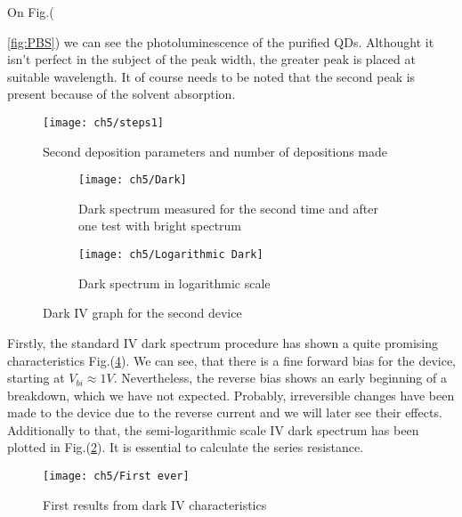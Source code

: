 On Fig.({\ref{fig:PBS}) we can see the photoluminescence of the purified QDs. Althought it isn't perfect in the subject of the peak width, the greater peak is placed at suitable wavelength. It of course needs to be noted that the second peak is present because of the solvent absorption. 

\begin{figure}[H]
\centering
\texttt{[image: ch5/steps1]}
\caption{Second deposition parameters and number of depositions made}
\label{fig:steps1}
\end{figure}

\begin{figure}
\centering
\begin{subfigure}[b]{0.83\textwidth}
\centering
\texttt{[image: ch5/Dark]}
\caption{Dark spectrum measured for the second time and after one test with bright spectrum}
\end{subfigure}

\hfill

\begin{subfigure}[b]{0.83\textwidth}
\centering
\texttt{[image: ch5/Logarithmic Dark]}
\caption{Dark spectrum in logarithmic scale}
\label{fig:logarithmic}
\end{subfigure}

\caption{Dark IV graph for the second device}
\label{fig:dark}
\end{figure}

\newpage
Firstly, the standard IV dark spectrum procedure has shown a quite promising characteristics Fig.(\ref{fig:firstever}). We can see, that there is a fine forward bias for the device, starting at $V_{bi} \approx 1V$. Nevertheless, the reverse bias shows an early beginning of a breakdown, which we have not expected. Probably, irreversible changes have been made to the device due to the reverse current and we will later see their effects. Additionally to that, the semi-logarithmic scale IV dark spectrum has been plotted in Fig.(\ref{fig:logarithmic}). It is essential to calculate the series resistance.

\begin{figure}
\centering
\texttt{[image: ch5/First ever]}
\caption{First results from dark IV characteristics}
\label{fig:firstever}
\end{figure}

}
